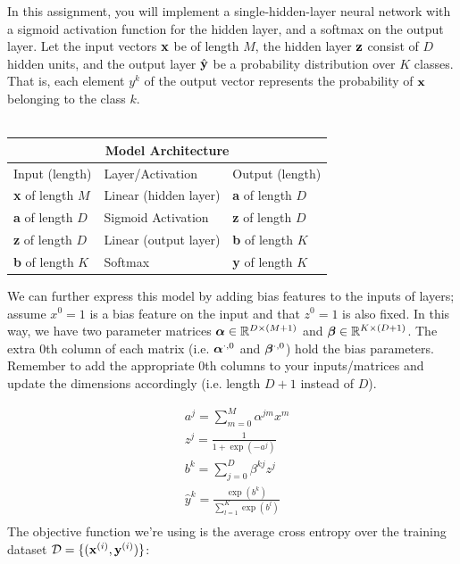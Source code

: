 In this assignment, you will implement a single-hidden-layer neural network with a sigmoid activation function for the hidden layer, and a softmax on the output layer. Let the input vectors $\mathbf{x}$ be of length $M$, the hidden layer $\mathbf{z}$ consist of $D$ hidden units, and the output layer $\hat{\mathbf{y}}$ be a probability distribution over $K$ classes. That is, each element $y^k$ of the output vector represents the probability of $\mathbf{x}$ belonging to the class $k$. 
\\\\\begin{center}
    
\begin{tabular}{ |p{3cm}|p{4cm}|p{3cm}|  }
\hline
\multicolumn{3}{|c|}{Model Architecture} \\
\hline
Input (length) & Layer/Activation & Output (length) \\
\hline
\textbf{x} of length $M$ & Linear (hidden layer) & \textbf{a} of length $D$ \\
\textbf{a} of length $D$ & Sigmoid Activation   & \textbf{z} of length $D$ \\
\textbf{z} of length $D$ & Linear (output layer) & \textbf{b} of length $K$ \\
\textbf{b} of length $K$  & Softmax & \textbf{y} of length $K$ \\
\hline
\end{tabular}
\end{center}\par
\vspace{0.2in}
We can further express this model by adding bias features to the inputs of layers; assume $x^0=1$ is a bias feature on the input and that $z^0=1$ is also fixed. In this way, we have two parameter matrices $\boldsymbol \alpha \in \mathbb{R}^{D \times (M+1)}$ and $\boldsymbol \beta \in \mathbb{R}^{K \times (D+1)}$. The extra $0$th column of each matrix (i.e. $\boldsymbol \alpha^{\cdot,0}$ and $\boldsymbol \beta^{\cdot,0}$) hold the bias parameters. Remember to add the appropriate 0th columns to your inputs/matrices and update the dimensions accordingly (i.e. length $D+1$ instead of $D$). 

\begin{align*}
& a^j = \sum_{m=0}^M \alpha^{jm} x^m \\
& z^j = \frac{1}{1+\exp(-a^j)} \\
& b^k =  \sum_{j=0}^D \beta^{kj} z^j\\
& \hat{y}^k = \frac{\exp(b^k)}{\sum_{l=1}^K \exp(b^l)}\\
\end{align*}
The objective function we're using is the average cross entropy over the training dataset $\mathcal{D} = \{ (\mathbf{x}^{(i)}, \mathbf{y}^{(i)}) \}$:

